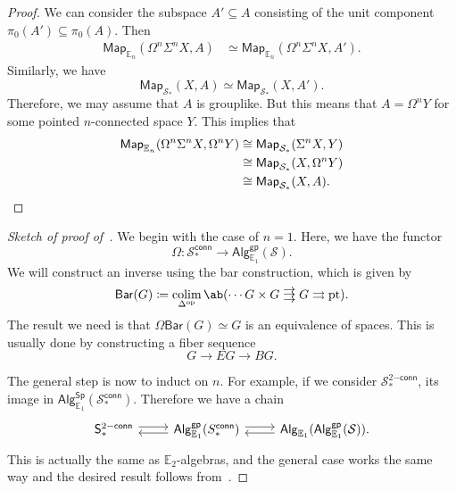 \documentclass[10pt, oneside]{memoir}
\theoremstyle{definition}
\theoremstyle{remark}
\theoremstyle{plain}
\theoremstyle{definition}
\theoremstyle{remark}
\newcommand{\E}{\mathbb{E}}
\newcommand{\mc}[1]{\mathcal{#1}}
\newcommand{\mr}[1]{\mathrm{#1}}
\newcommand{\ms}[1]{\mathsf{#1}}
\newcommand{\1}{\mathbf{1}}
\newcommand{\2}{\mathbf{2}}
\newcommand{\3}{\mathbf{3}}
\newcommand{\pt}{\mr{pt}}
\newcommand*{\triple}[2][.1ex]{%
    \mathrel{\vcenter{\offinterlineskip%
    \hbox{$#2$}\vskip#1\hbox{$#2$}\vskip#1\hbox{$#2$}}}}
\DeclareMathOperator{\op}{op}
\DeclareMathOperator*{\colim}{colim}
\begin{document}
\begin{proof}
    We can consider the subspace $A' \subseteq A$ consisting of the unit component $\pi_0(A') \subseteq \pi_0(A)$. Then
    \begin{align*}
        \ms{Map}_{\E_n}(\Omega^n \Sigma^n X, A) &\simeq \ms{Map}_{\E_n} (\Omega^n \Sigma^n X, A').
    \end{align*}
    Similarly, we have
    \[ \ms{Map}_{\mc{S}_*}(X, A) \simeq \ms{Map}_{\mc{S}_*}(X, A'). \]
    Therefore, we may assume that $A$ is grouplike. But this means that $A = \Omega^n Y$ for some pointed $n$-connected space $Y$. This implies that
    \begin{align*}
        \ms{Map}_{\E_n}(\Omega^n \Sigma^n X, \Omega^n Y) &\cong \ms{Map}_{\mc{S}_*} (\Sigma^n X, Y) \\
        &\cong \ms{Map}_{\mc{S}_*}(X, \Omega^n Y) \\
        &\cong \ms{Map}_{\mc{S}_*}(X, A). \qedhere
    \end{align*}
\end{proof}

\begin{proof}[Sketch of proof of~]
    We begin with the case of $n=1$. Here, we have the functor
    \[ \Omega \colon \mc{S}_*^{\ms{conn}} \to \ms{Alg}_{\E_1}^{\ms{gp}}(\mc{S}). \]
    We will construct an inverse using the bar construction, which is given by
    \[ \ms{Bar}(G) \coloneqq \colim_{\Delta^{\op}} \ab(\cdots G \times G \triple{\to} G \rightrightarrows \pt). \]
    The result we need is that $\Omega \ms{Bar}(G) \simeq G$ is an equivalence of spaces. This is usually done by constructing a fiber sequence
    \[ G \to EG \to BG. \]

    The general step is now to induct on $n$. For example, if we consider $\mc{S}_*^{2\ms{-conn}}$, its image in $\ms{Alg}_{\E_1}^{\ms{Sp}}(\mc{S}_*^{\ms{conn}})$. Therefore we have a chain
    \begin{equation*}
    \begin{tikzcd}
        \ms{S}_*^{2\ms{-conn}} \ar[shift left=1]{r} & \ms{Alg}_{\E_1}^{\ms{gp}} (S_*^{\ms{conn}})\ar[shift left=1]{r} \ar[shift left=1]{l} & \ms{Alg}_{\E_1}(\ms{Alg}_{\E_1}^{\ms{gp}}(\mc{S})). \ar[shift left=1]{l}
    \end{tikzcd}
    \end{equation*}
    This is actually the same as $\E_2$-algebras, and the general case works the same way and the desired result follows from~.
\end{proof}
\end{document}
